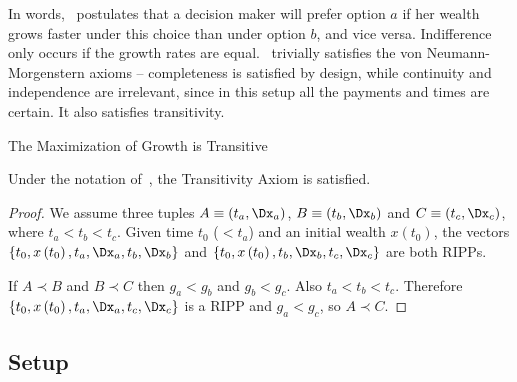 In words,~ postulates that a decision maker will prefer option $a$ if her wealth grows faster under this choice than under option $b$, and vice versa. Indifference only occurs if the growth rates are equal.~ trivially satisfies the von Neumann-Morgenstern axioms -- completeness is satisfied by design, while continuity and independence are irrelevant, since in this setup all the payments and times are certain. It also satisfies transitivity.

\begin{proposition}{The Maximization of Growth is Transitive}

Under the notation of~, the Transitivity Axiom is satisfied.
\label{prop:trans}
\end{proposition}



\begin{proof}

We assume three tuples $A\equiv\left(t_a,\Dx_a\right)$, $B\equiv\left(t_b,\Dx_b\right)$ and $C\equiv\left(t_c,\Dx_c\right)$, where $t_a < t_b < t_c$. Given time $t_0$ ($< t_a$) and an initial wealth $x\left(t_0\right)$, the vectors $\{t_0,x\left(t_0\right),t_a,\Dx_a,t_b,\Dx_b\}$ and $\{t_0,x\left(t_0\right),t_b,\Dx_b,t_c,\Dx_c\}$ are both RIPPs.

If $A \prec B$ and $B \prec C$ then $g_a < g_b$ and $g_b < g_c$. Also $t_a < t_b < t_c$. Therefore $\{t_0,x\left(t_0\right),t_a,\Dx_a,t_c,\Dx_c\}$ is a RIPP and $g_a < g_c$, so $A \prec C$.

\end{proof}


\subsection{Setup}

